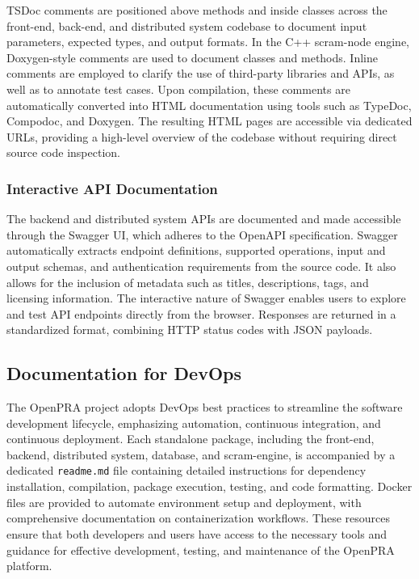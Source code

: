 TSDoc comments are positioned above methods and inside classes across the front-end, back-end, and distributed system codebase to document input parameters, expected types, and output formats. In the C++ scram-node engine, Doxygen-style comments are used to document classes and methods. Inline comments are employed to clarify the use of third-party libraries and APIs, as well as to annotate test cases. Upon compilation, these comments are automatically converted into HTML documentation using tools such as TypeDoc, Compodoc, and Doxygen. The resulting HTML pages are accessible via dedicated URLs, providing a high-level overview of the codebase without requiring direct source code inspection.



\subsubsection{Interactive API Documentation}

The backend and distributed system APIs are documented and made accessible through the Swagger UI, which adheres to the OpenAPI specification. Swagger automatically extracts endpoint definitions, supported operations, input and output schemas, and authentication requirements from the source code. It also allows for the inclusion of metadata such as titles, descriptions, tags, and licensing information. The interactive nature of Swagger enables users to explore and test API endpoints directly from the browser. Responses are returned in a standardized format, combining HTTP status codes with JSON payloads.



\subsection{Documentation for DevOps}

The OpenPRA project adopts DevOps best practices to streamline the software development lifecycle, emphasizing automation, continuous integration, and continuous deployment. Each standalone package, including the front-end, backend, distributed system, database, and scram-engine, is accompanied by a dedicated \texttt{readme.md} file containing detailed instructions for dependency installation, compilation, package execution, testing, and code formatting. Docker files are provided to automate environment setup and deployment, with comprehensive documentation on containerization workflows. These resources ensure that both developers and users have access to the necessary tools and guidance for effective development, testing, and maintenance of the OpenPRA platform.
